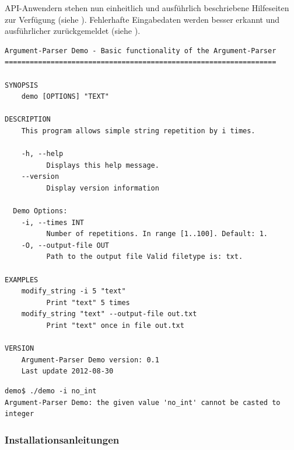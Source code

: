 \bigskip

\begin{minipage}{\textwidth}
API-Anwendern stehen nun einheitlich und ausführlich beschriebene Hilfeseiten zur Verfügung (siehe ). Fehlerhafte Eingabedaten werden besser erkannt und ausführlicher zurückgemeldet (siehe ).

\begin{center}
\begin{verbatim}
Argument-Parser Demo - Basic functionality of the Argument-Parser
=================================================================

SYNOPSIS
    demo [OPTIONS] "TEXT"

DESCRIPTION
    This program allows simple string repetition by i times.

    -h, --help
          Displays this help message.
    --version
          Display version information

  Demo Options:
    -i, --times INT
          Number of repetitions. In range [1..100]. Default: 1.
    -O, --output-file OUT
          Path to the output file Valid filetype is: txt.

EXAMPLES
    modify_string -i 5 "text"
          Print "text" 5 times
    modify_string "text" --output-file out.txt
          Print "text" once in file out.txt

VERSION
    Argument-Parser Demo version: 0.1
    Last update 2012-08-30
\end{verbatim}
\label{lst:argparser-help}
\end{center}
\end{minipage}

\bigskip

\begin{minipage}{\textwidth}
\begin{center}
\begin{verbatim}
demo$ ./demo -i no_int
Argument-Parser Demo: the given value 'no_int' cannot be casted to integer
\end{verbatim}
\label{lst:argparser-error}
\end{center}
\end{minipage}



\subsubsection{Installationsanleitungen}

